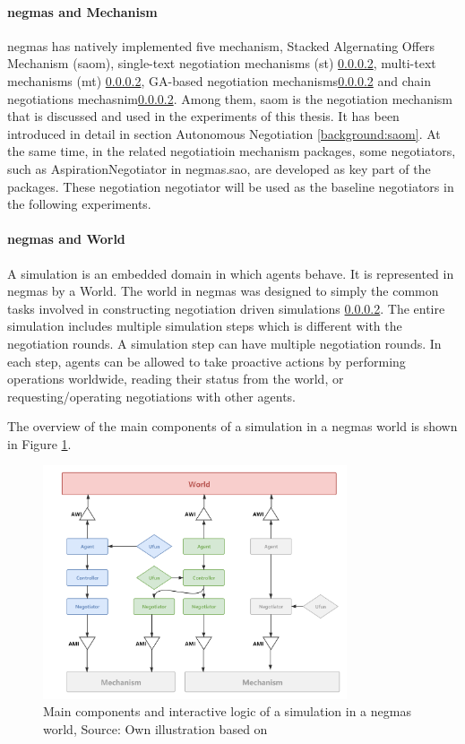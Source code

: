 \paragraph{\gls{negmas} and Mechanism}
\gls{negmas} has natively implemented five mechanism, Stacked Algernating Offers Mechanism (\gls{saom}), single-text negotiation mechanisms (st) \ref{}, multi-text mechanisms (mt) \ref{}, GA-based negotiation mechanisms\ref{} and chain negotiations mechasnim\ref{}. Among them, \gls{saom} is the negotiation mechanism that is discussed and used in the experiments of this thesis. It has been introduced in detail in section Autonomous Negotiation \ref{background:saom}. At the same time, in the related negotiatioin mechanism packages, some negotiators, such as AspirationNegotiator in negmas.sao, are developed as key part of the packages. These negotiation negotiator will be used as the baseline negotiators in the following experiments.
\paragraph{\gls{negmas} and World}
A simulation is an embedded domain in which agents behave. It is represented in \gls{negmas} by a World. The world in \gls{negmas} was designed to simply the common tasks involved in constructing negotiation driven simulations \ref{}. The entire simulation includes multiple simulation steps which is different with the negotiation rounds. A simulation step can have multiple negotiation rounds. In each step, agents can be allowed to take proactive actions by performing operations worldwide, reading their status from the world, or requesting/operating negotiations with other agents.

The overview of the main components of a simulation in a \gls{negmas} world is shown in Figure \ref{fig:overview-negmas}.

\begin{figure}[htbp]
\centering
\includegraphics[width=0.8\textwidth]{./images/overview-negmas.png}
\caption{Main components and interactive logic of a simulation in a \gls{negmas} world, Source: Own illustration based on\parencite{Mohammad2019}}
\label{fig:overview-negmas}
\end{figure}

